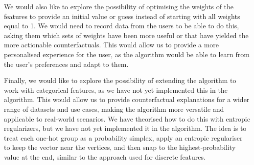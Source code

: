 \documentclass[12pt]{extarticle}
\numberwithin{equation}{section}
\begin{document}
We would also like to explore the possibility of optimising the weights of the features to provide an initial value or guess instead of starting with all weights equal to 1. We would need to record data from the users to be able to do this, asking them which sets of weights have been more useful or that have yielded the more actionable counterfactuals. This would allow us to provide a more personalised experience for the user, as the algorithm would be able to learn from the user's preferences and adapt to them.

Finally, we would like to explore the possibility of extending the algorithm to work with categorical features, as we have not yet implemented this in the algorithm. This would allow us to provide counterfactual explanations for a wider range of datasets and use cases, making the algorithm more versatile and applicable to real-world scenarios. We have theorised how to do this with entropic regularizers, but we have not yet implemented it in the algorithm. The idea is to treat each one-hot group as a probability simplex, apply an entropic regulariser to keep the vector near the vertices, and then snap to the highest-probability value at the end, similar to the approach used for discrete features.
\end{document}
